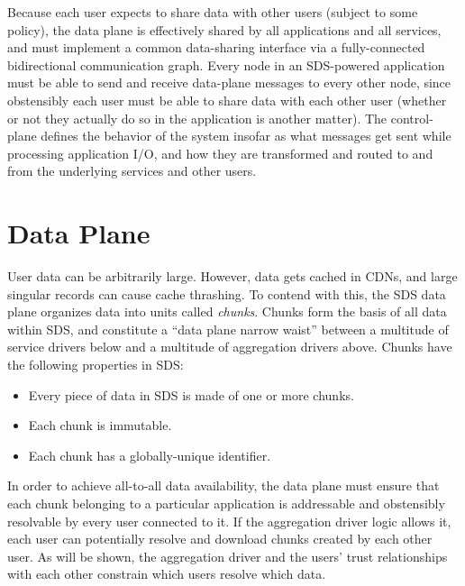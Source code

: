 Because each user expects to share data with other users (subject to some
policy), the data plane is effectively shared by all applications and all
services, and must implement a common data-sharing interface via a fully-connected
bidirectional communication graph.
Every node in an SDS-powered application must be able to send and receive data-plane
messages to every other node, since obstensibly each user must be able to share
data with each other user (whether or not they actually do so in the application
is another matter).  The control-plane defines the behavior of the
system insofar as what messages get sent while processing application I/O, and how they are
transformed and routed to and from the underlying services and other users.

\section{Data Plane}

User data can be arbitrarily large.  However, data gets cached in CDNs, and
large singular records can cause cache thrashing.  To contend with this,
the SDS data plane organizes data into units called \emph{chunks}.  Chunks form
the basis of all data within SDS, and constitute a ``data plane narrow waist'' between 
a multitude of service drivers below and a multitude of aggregation drivers
above.  Chunks have the following properties in SDS:

\begin{itemize}
    \item Every piece of data in SDS is made of one or more chunks.
    \item Each chunk is immutable.
    \item Each chunk has a globally-unique identifier.
\end{itemize}

In order to achieve all-to-all data availability, the 
data plane must ensure that each chunk belonging to a particular application
is addressable and obstensibly resolvable by every user connected to it.
If the aggregation driver logic allows it, each user
can potentially resolve and download chunks created by each other user.
As will be shown, the aggregation driver and the users' trust relationships with
each other constrain which users resolve which data.

